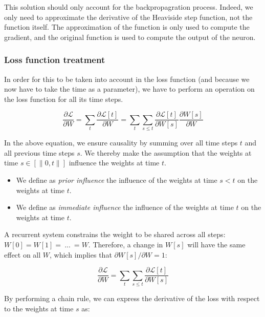 \documentclass[11pt]{article}
\begin{document}
This solution should only account for the backpropagration process. Indeed, we only need to approximate the derivative of the Heaviside step function, not the function itself. The approximation of the function is only used to compute the gradient, and the original function is used to compute the output of the neuron.

\subsubsection{Loss function treatment}

In order for this to be taken into account in the loss function (and because we now have to take the time as a parameter), we have to perform an operation on the loss function for all its time steps.

\begin{equation}
  \frac{\partial \mathcal{L}}{\partial W}=\sum_t \frac{\partial\mathcal{L}[t]}{\partial W} =
  \sum_t \sum_{s\leq t} \frac{\partial\mathcal{L}[t]}{\partial W[s]}\frac{\partial W[s]}{\partial W}
\end{equation}

In the above equation, we ensure causality by summing over all time steps $t$ and all previous time steps $s$. We thereby make the assumption that the weights at time $s \in \left[\|0, t \|\right]$ influence the weights at time $t$.

\begin{itemize}
  \item We define as \textit{prior influence} the influence of the weights at time $s < t$ on the weights at time $t$.
  \item We define as \textit{immediate influence} the influence of the weights at time $t$ on the weights at time $t$.
\end{itemize}

A recurrent system constrains the weight to be shared across all steps: $W[0]=W[1] =~... ~ = W$. Therefore, a change in $W[s]$ will have the same effect on all $W$, which implies that
$\partial W[s]/\partial W=1$:

\begin{equation}
  \frac{\partial \mathcal{L}}{\partial W}=
  \sum_t \sum_{s\leq t} \frac{\partial\mathcal{L}[t]}{\partial W[s]}
\end{equation}

By performing a chain rule, we can express the derivative of the loss with respect to the weights at time $s$ as:
\end{document}
